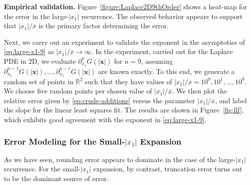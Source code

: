 \documentclass[12pt]{article}
\def\R{{\mathbb R}}
\let\b=\boldsymbol
\theoremstyle{definition}
\theoremstyle{plain}
\theoremstyle{definition}
\begin{document}
\textbf{Empirical validation.} Figure~\ref{figure:Laplace2D9thOrder} shows a heat-map for the error in the large-$|x_1|$ recurrence. The observed behavior appears to support that $|x_1|/\overline{x}$ is the primary factor determining the error.

Next, we carry out an experiment to validate the exponent in the asymptotics of \eqref{eq:large-x1-9} as $|x_1|/\overline{x} \to \infty$. In the experiment, carried out for the Laplace PDE in 2D, we evaluate $\partial^n_{x_1} G(|\b{x}|)$ for $n = 9$, assuming $\partial^{n-1}_{x_1} G(|\b{x}|), \dots, \partial^{n-r}_{x_1} G(|\b{x}|)$ are known exactly. To this end, we generate a random set of points in $\R^2$ such that they have values of $|x_1|/\overline{x} = 10^0, 10^1, \dots, 10^9$. We choose five random points per chosen value of $|x_1|/\overline{x}$. We then plot the relative error given by \eqref{eq:crude-additions} versus the parameter $|x_1|/\overline{x}$, and label the slope for the linear least squares fit. The results are shown in Figure~\ref{fig:llf}, which exhibits good agreement with the exponent in \eqref{eq:large-x1-9}.

\subsubsection{Error Modeling for the Small-$|x_1|$ Expansion}
As we have seen, rounding error appears to dominate in the case of the large-$|x_1|$ recurrence. For the small-$|x_1|$ expansion, by contrast,
truncation error turns out to be the dominant source of error.
\end{document}
